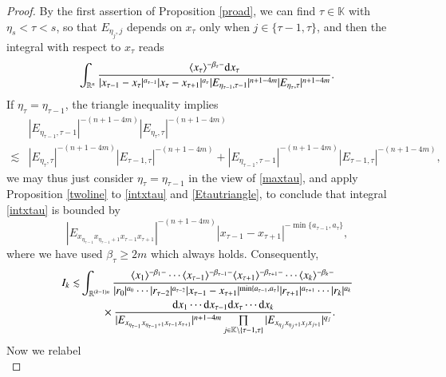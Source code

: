 \documentclass[11pt,reqno]{amsart}
\def\d{{\rm d}}
\numberwithin{equation}{section}
\theoremstyle{definition}
\begin{document}
\begin{proof}
	
	By the first assertion of Proposition \ref{proad}, we can find $\tau\in\mathbb{K}$ with $\eta_s<\tau< s$, so that $E_{\eta_j,j}$ depends on $x_\tau$ only when $j\in\{\tau-1,\tau\}$, and then the integral with respect to $x_\tau$ reads
	\begin{equation}\label{intxtau}
		\int_{\mathbb{R}^n}\frac{\langle x_\tau\rangle^{-\beta_\tau-}\d x_\tau}{|x_{\tau-1}-x_\tau|^{a_{\tau-1}}|x_\tau-x_{\tau+1}|^{a_\tau}|E_{\eta_{\tau-1},\tau-1}|^{n+1-4m}|E_{\eta_\tau,\tau}|^{n+1-4m}}.
	\end{equation}
	If $\eta_\tau=\eta_{\tau-1}$, the triangle inequality implies
	\begin{equation}\label{Etautriangle}
		\begin{split}
			&|E_{\eta_{\tau-1},\tau-1}|^{-(n+1-4m)}|E_{\eta_\tau,\tau}|^{-(n+1-4m)}\\
			\lesssim&|E_{\eta_\tau,\tau}|^{-(n+1-4m)}|E_{\tau-1,\tau}|^{-(n+1-4m)}+|E_{\eta_{\tau-1},\tau-1}|^{-(n+1-4m)}|E_{\tau-1,\tau}|^{-(n+1-4m)},
		\end{split}
	\end{equation}
	we may thus just consider $\eta_\tau=\eta_{\tau-1}$ in the view of \eqref{maxtau}, and apply Proposition \ref{twoline} to \eqref{intxtau} and \eqref{Etautriangle}, to conclude that integral \eqref{intxtau} is bounded by
	\begin{equation*}\label{inttaubd}
		|E_{x_{\eta_{\tau-1}}x_{\eta_{\tau-1}+1}x_{\tau-1}x_{\tau+1}}|^{-(n+1-4m)}|x_{\tau-1}-x_{\tau+1}|^{-\min\{a_{\tau-1},a_\tau\}},
	\end{equation*}
	where we have used $\beta_\tau\geq2m$ which always holds. Consequently,
	\begin{equation}\label{Ik1st}
		\begin{split}
			I_k\lesssim&\int_{\mathbb{R}^{(k-1)n}}\frac{\langle x_1\rangle^{-\beta_1-}\cdots\langle x_{\tau-1}\rangle^{-\beta_{\tau-1}-}\langle x_{\tau+1}\rangle^{-\beta_{\tau+1}-}\cdots\langle x_k\rangle^{-\beta_k-}}{|r_0|^{a_0}\cdots|r_{\tau-2}|^{a_{\tau-2}}|x_{\tau-1}-x_{\tau+1}|^{\min\{a_{\tau-1},a_\tau\}}|r_{\tau+1}|^{a_{\tau+1}}\cdots|r_k|^{a_k}}\\
			&\quad\quad\times\frac{\d x_1\cdots \d x_{\tau-1}\d x_\tau\cdots \d x_k}{|E_{x_{\eta_{\tau-1}}x_{\eta_{\tau-1}+1}x_{\tau-1}x_{\tau+1}}|^{n+1-4m}\prod\limits_{j\in\mathbb{K}\setminus\{\tau-1,\tau\}}|E_{x_{\eta_j}x_{\eta_j+1}x_jx_{j+1}}|^{q_j}}.
		\end{split}
	\end{equation}
	Now we relabel
	\begin{equation*}\label{relabel1}

\end{equation*}
\end{proof}
\end{document}
